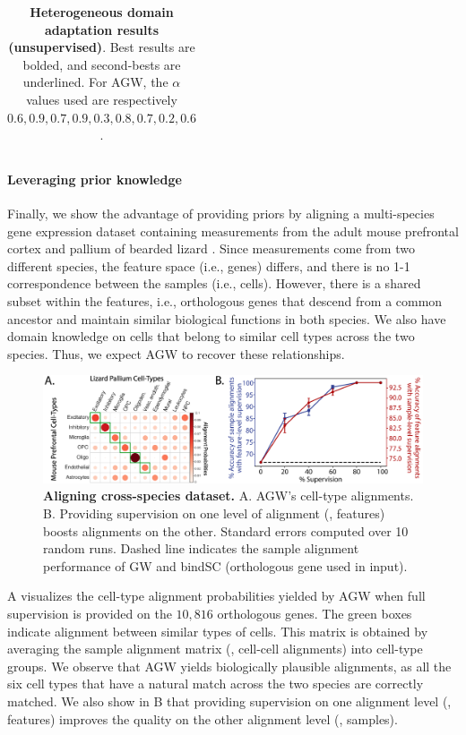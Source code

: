 \begin{table}[t]
\begin{center}
{\begin{tabular}{@{}lccccccccc@{}}
\bottomrule
\end{tabular}}
\end{center}
\caption{\label{tab:hda_agw}
\textbf{Heterogeneous domain adaptation results (unsupervised)}.
Best results are bolded, and second-bests are underlined. For AGW,
the $\alpha$ values used are respectively $0.6, 0.9, 0.7, 0.9, 0.3, 0.8, 0.7, 0.2, 0.6$. }
\end{table}

\paragraph{Leveraging prior knowledge}
Finally, we show the advantage of providing priors by aligning a
multi-species gene expression dataset containing measurements from
the adult mouse prefrontal cortex \citep{mouse} and pallium of bearded lizard \citep{lizard}.
Since measurements come from two different species, the feature space (i.e., genes) differs,
and there is no 1-1 correspondence between the samples (i.e., cells). However,
there is a shared subset within the features, i.e., orthologous genes that
descend from a common ancestor and maintain similar biological functions in both species.
We also have domain knowledge on cells that belong to similar cell types across the two species.
Thus, we expect AGW to recover these relationships.

\begin{figure}[t]
\centering
\includegraphics[width=\linewidth]{./Chapitre5/fig/xSp_full.png}
\caption[Aligning cross-species dataset]{\label{fig:xsp} \textbf{Aligning cross-species dataset.}
A. AGW's cell-type alignments.
B. Providing supervision on one level of alignment (\eg, features)
boosts alignments on the other. Standard errors computed over 10 random runs.
Dashed line indicates the sample alignment performance of GW and bindSC
(orthologous gene used in input).}
\end{figure}

A visualizes the cell-type alignment probabilities yielded by AGW
when full supervision is provided on the $10,816$ orthologous genes.
The green boxes indicate alignment between similar types of cells.
This matrix is obtained by averaging the sample alignment matrix
(\ie, cell-cell alignments) into cell-type groups. We observe that
AGW yields biologically plausible alignments, as all the six cell types that
have a natural match across the two species are correctly matched.
We also show in B that providing supervision on one alignment level (\eg,
features) improves the quality on the other alignment level (\eg, samples).

